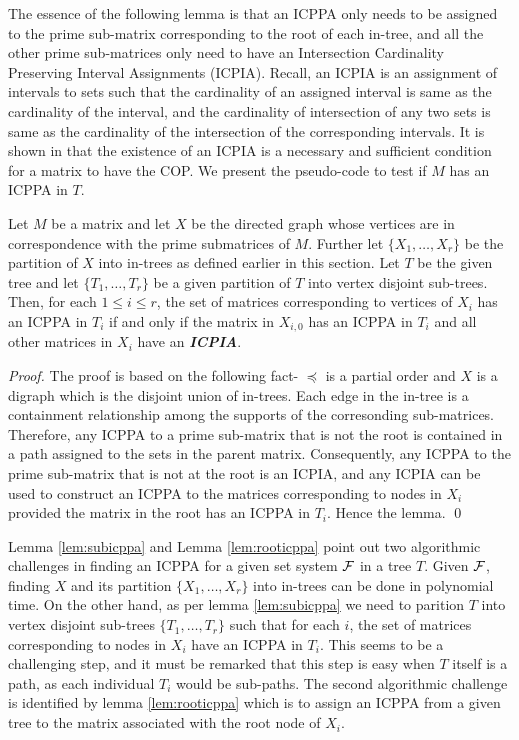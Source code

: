\documentclass{llncs}
\def\cF{{\cal F}}
\begin{document}
 The essence of the following lemma is that an ICPPA only needs to be
 assigned to the prime sub-matrix corresponding to the root of each
 in-tree, and all the other prime sub-matrices only need to have an
 Intersection Cardinality Preserving Interval Assignments (ICPIA).
 Recall, an ICPIA is an assignment of intervals to sets such that the
 cardinality of an assigned interval is same as the cardinality of the
 interval, and the cardinality of intersection of any two sets is same
 as the cardinality of the intersection of the corresponding
 intervals.  It is shown in \cite{nsnrs09} that the existence of an
 ICPIA is a necessary and sufficient condition for a matrix to have
 the COP.  
We present the pseudo-code to test if $M$ has an ICPPA in $T$. 
\begin{lemma} \label{lem:rooticppa}
Let $M$ be a matrix and let $X$ be the directed graph whose vertices
are in correspondence with the prime submatrices of $M$.  Further let
$\{X_1,\ldots,X_r\}$ be the partition of $X$ into in-trees as defined
earlier in this section. 
Let $T$ be the given tree and let $\{T_1, \ldots, T_r\}$ be a given
partition of $T$ into vertex disjoint sub-trees. 
Then, for each $1 \leq i \leq r$, the set of matrices corresponding to
vertices of $X_i$ has an ICPPA in $T_i$ if and only if the matrix in
$X_{i,0}$ has an ICPPA in $T_i$ and all other matrices in $X_i$ have
an {\bf {\em ICPIA}}. 
\end{lemma}
\begin{proof}
The proof is based on the following fact- $\preccurlyeq$ is a partial
order and $X$ is a digraph which is the disjoint 
union of in-trees.  Each edge in the in-tree is a containment
relationship among the supports of the corresonding
sub-matrices. Therefore, any ICPPA to a prime sub-matrix that is not
the root is contained in a path assigned to the sets in the parent
matrix.  Consequently, any ICPPA to the prime sub-matrix that is not
at the root is an ICPIA, and any ICPIA can be used to construct an
ICPPA to the matrices corresponding to nodes in $X_i$ provided the
matrix in the root has an ICPPA in $T_i$.   Hence the lemma. \qed
\end{proof}
Lemma \ref{lem:subicppa} and Lemma \ref{lem:rooticppa} point out two
algorithmic challenges in finding an ICPPA for a given set system
$\cF$ in a tree $T$.  Given $\cF$, finding $X$ and its partition
$\{X_1,\ldots,X_r\}$ into in-trees can be done in polynomial time.  On
the other hand, as per lemma \ref{lem:subicppa} we need to parition
$T$ into vertex disjoint sub-trees $\{T_1, \ldots, T_r\}$ such that
for each $i$, the set of matrices corresponding  to nodes in $X_i$
have an ICPPA in $T_i$.  This seems to be a challenging step, and it
must be remarked that this step is easy when $T$ itself is a path, as
each individual $T_i$ would be sub-paths.  The second algorithmic
challenge is identified by lemma \ref{lem:rooticppa} which is to
assign an ICPPA from a given tree to the matrix associated with the
root node of $X_i$. 
  
\end{document}
